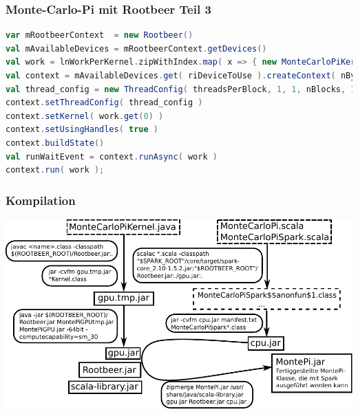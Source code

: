 \begin{frame}[fragile]
    \frametitle{Monte-Carlo-Pi mit Rootbeer Teil 3}
    \begin{lstlisting}[language=scala]
var mRootbeerContext  = new Rootbeer()
val mAvailableDevices = mRootbeerContext.getDevices()
val work = lnWorkPerKernel.zipWithIndex.map( x => { new MonteCarloPiKernel( lnHits(iGpu), lnIterations(iGpu), seed, nIterations ) } )
val context = mAvailableDevices.get( riDeviceToUse ).createContext( nBytesMemoryNeeded )
val thread_config = new ThreadConfig( threadsPerBlock, 1, 1, nBlocks, 1, work.size );
context.setThreadConfig( thread_config )
context.setKernel( work.get(0) )
context.setUsingHandles( true )
context.buildState()
val runWaitEvent = context.runAsync( work )
context.run( work );
\end{lstlisting}\vspace{-1.5\baselineskip}
\end{frame}

\begin{frame}
    \frametitle{Kompilation}
    \centerline{\includegraphics[width=1.15\linewidth]{compile-structure-deu-new-short.pdf}}
\end{frame}



